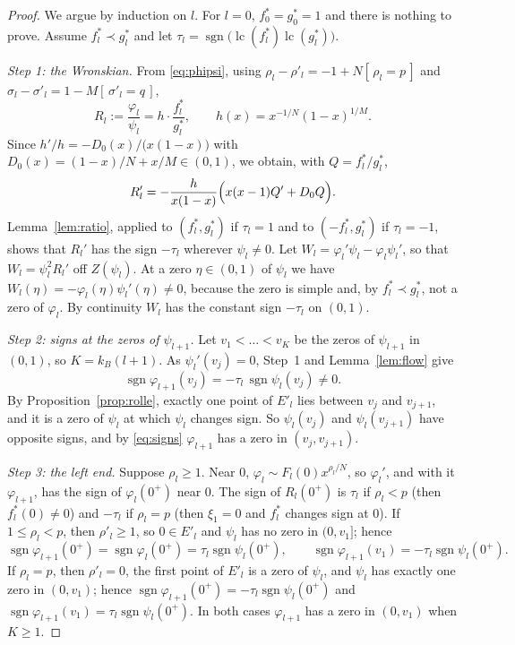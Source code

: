 \documentclass[11pt]{amsart}
\theoremstyle{definition}
\theoremstyle{remark}
\numberwithin{equation}{section}
\newcommand{\ind}[1]{[\,#1\,]}
\DeclareMathOperator{\lc}{lc}
\DeclareMathOperator{\sgn}{sgn}
\begin{document}
\begin{proof}
We argue by induction on $l$. For $l=0$, $f_0^*=g_0^*=1$ and there is nothing to prove. Assume $f^*_l\prec g^*_l$ and let $\tau_l=\sgn\bigl(\lc(f^*_l)\lc(g^*_l)\bigr)$.

\emph{Step 1: the Wronskian.} From \eqref{eq:phipsi}, using $\rho_l-\rho'_l=-1+N\ind{\rho_l=p}$ and $\sigma_l-\sigma'_l=1-M\ind{\sigma'_l=q}$,
\[
R_l:=\frac{\varphi_l}{\psi_l}=h\cdot\frac{f^*_l}{g^*_l},\qquad h(x)=x^{-1/N}(1-x)^{1/M}.
\]
Since $h'/h=-D_0(x)/\bigl(x(1-x)\bigr)$ with $D_0(x)=(1-x)/N+x/M\in(0,1)$, we obtain, with $Q=f^*_l/g^*_l$,
\[
R_l'=-\frac{h}{x(1-x)}\Bigl(x(x-1)Q'+D_0Q\Bigr).
\]
Lemma~\ref{lem:ratio}, applied to $(f^*_l,g^*_l)$ if $\tau_l=1$ and to $(-f^*_l,g^*_l)$ if $\tau_l=-1$, shows that $R_l'$ has the sign $-\tau_l$ wherever $\psi_l\ne0$. Let $W_l=\varphi_l'\psi_l-\varphi_l\psi_l'$, so that $W_l=\psi_l^2R_l'$ off $Z(\psi_l)$. At a zero $\eta\in(0,1)$ of $\psi_l$ we have $W_l(\eta)=-\varphi_l(\eta)\psi_l'(\eta)\ne0$, because the zero is simple and, by $f^*_l\prec g^*_l$, not a zero of $\varphi_l$. By continuity $W_l$ has the constant sign $-\tau_l$ on $(0,1)$.

\emph{Step 2: signs at the zeros of $\psi_{l+1}$.} Let $v_1<\dots<v_K$ be the zeros of $\psi_{l+1}$ in $(0,1)$, so $K=k_B(l+1)$. As $\psi_l'(v_j)=0$, Step~1 and Lemma~\ref{lem:flow} give
\begin{equation}\label{eq:signs}
\sgn\varphi_{l+1}(v_j)=-\tau_l\,\sgn\psi_l(v_j)\neq0 .
\end{equation}
By Proposition~\ref{prop:rolle}, exactly one point of $E'_l$ lies between $v_j$ and $v_{j+1}$, and it is a zero of $\psi_l$ at which $\psi_l$ changes sign. So $\psi_l(v_j)$ and $\psi_l(v_{j+1})$ have opposite signs, and by \eqref{eq:signs} $\varphi_{l+1}$ has a zero in $(v_j,v_{j+1})$.

\emph{Step 3: the left end.} Suppose $\rho_l\ge1$. Near $0$, $\varphi_l\sim F_l(0)x^{\rho_l/N}$, so $\varphi_l'$, and with it $\varphi_{l+1}$, has the sign of $\varphi_l(0^+)$ near $0$. The sign of $R_l(0^+)$ is $\tau_l$ if $\rho_l<p$ (then $f^*_l(0)\ne0$) and $-\tau_l$ if $\rho_l=p$ (then $\xi_1=0$ and $f^*_l$ changes sign at $0$). If $1\le\rho_l<p$, then $\rho'_l\ge1$, so $0\in E'_l$ and $\psi_l$ has no zero in $(0,v_1]$; hence
\[
\sgn\varphi_{l+1}(0^+)=\sgn\varphi_l(0^+)=\tau_l\sgn\psi_l(0^+),\qquad\sgn\varphi_{l+1}(v_1)=-\tau_l\sgn\psi_l(0^+).
\]
If $\rho_l=p$, then $\rho'_l=0$, the first point of $E'_l$ is a zero of $\psi_l$, and $\psi_l$ has exactly one zero in $(0,v_1)$; hence $\sgn\varphi_{l+1}(0^+)=-\tau_l\sgn\psi_l(0^+)$ and $\sgn\varphi_{l+1}(v_1)=\tau_l\sgn\psi_l(0^+)$. In both cases $\varphi_{l+1}$ has a zero in $(0,v_1)$ when $K\ge1$.


\end{proof}
\end{document}
